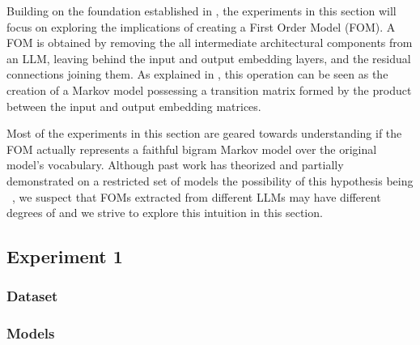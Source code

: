 Building on the foundation established in , the experiments in this section will focus on exploring the implications of creating a First Order Model (FOM).
A FOM is obtained by removing the all intermediate architectural components from an LLM, leaving behind the input and output embedding layers, and the residual connections joining them.
As explained in , this operation can be seen as the creation of a Markov model possessing a transition matrix formed by the product between the input and output embedding matrices.

Most of the experiments in this section are geared towards understanding if the FOM actually represents a faithful bigram Markov model over the original model's vocabulary.
Although past work has theorized and partially demonstrated on a restricted set of models the possibility of this hypothesis being ~\cite{elhage2021}, we suspect that FOMs extracted from different LLMs may have different degrees of  and we strive to explore this intuition in this section.

\subsection{Experiment 1}


\subsubsection{Dataset}


\subsubsection{Models}


